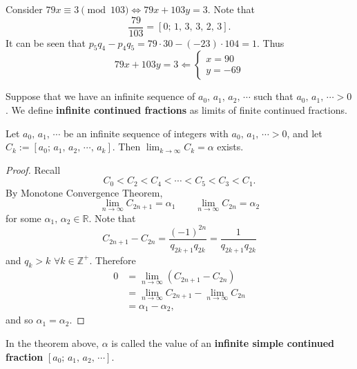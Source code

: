 \begin{remark}
    Consider $79x \equiv 3 \pmod{103} \Leftrightarrow 79x + 103y = 3$.
    Note that
    \[
        \frac{79}{103}=\left[0;\,1,\,3,\,3,\,2,\,3\right].
    \]
    It can be seen that $p_5q_4-p_4q_5 = 79\cdot 30 - \left(-23 \right)\cdot 104 = 1$.
    Thus
    \[
        79x + 103y = 3 \Leftarrow \begin{cases}
            x = 90 \\ 
            y = -69
        \end{cases}
    \]
\end{remark}

Suppose that we have an infinite sequence of $a_0,\,a_1,\,a_2,\,\cdots$ such that
$a_0,\,a_1,\,\cdots > 0$. We define \textbf{infinite continued fractions} as limits
of finite continued fractions.    

\begin{theorem}
    Let $a_0,\,a_1,\,\cdots$ be an infinite sequence of integers with
    $a_0,\,a_1,\,\cdots > 0$, and let $C_k := \left[a_0;\,a_1,\,a_2,\,\cdots,\,a_k\right]$.
    Then $\lim_{k\rightarrow \infty} C_k = \alpha$ exists.
\end{theorem}

\begin{proof}
    Recall
    \[
        C_0 < C_2 < C_4 < \cdots < C_5 < C_3 < C_1.
    \]
    By Monotone Convergence Theorem, 
    \[
        \lim_{n \rightarrow \infty} C_{2n+1}=\alpha_1
        \qquad
        \lim_{n \rightarrow \infty} C_{2n}=\alpha_2
    \]
    for some $\alpha_1,\,\alpha_2 \in \mathbb{R}$. Note that
    \[
        C_{2n+1}-C_{2n} = \frac{\left(-1\right)^{2n}}{q_{2k+1}q_{2k}} = \frac{1}{q_{2k+1}q_{2k}}
    \]
    and $q_k>k$ $\forall k \in \mathbb{Z}^+$.
    Therefore
    \begin{align*}
        0 &= \lim_{n \rightarrow \infty} \left(C_{2n+1}-C_{2n}\right) \\
        &= \lim_{n \rightarrow \infty} C_{2n+1}-\lim_{n \rightarrow \infty} C_{2n} \\
        &= \alpha_1 - \alpha_2,
    \end{align*}
    and so $\alpha_1 = \alpha_2$.
\end{proof}

\begin{definition}
    In the theorem above, $\alpha$ is called the value of an \textbf{infinite
    simple continued fraction} $\left[a_0;\,a_1,\,a_2,\,\cdots\right]$.
\end{definition}

